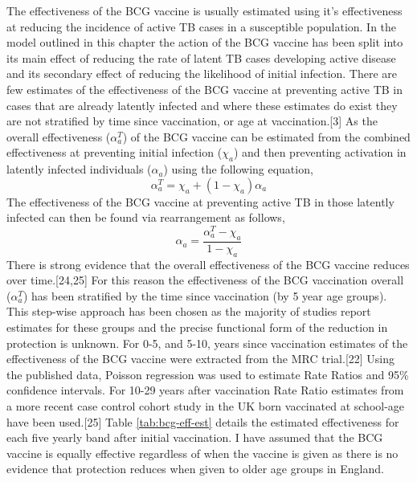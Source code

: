 \documentclass[11pt,twoside]{bristolthesis}
\begin{document}
  The effectiveness of the BCG vaccine is usually estimated using it's effectiveness at reducing the incidence of active TB cases in a susceptible population. In the model outlined in this chapter the action of the BCG vaccine has been split into its main effect of reducing the rate of latent TB cases developing active disease and its secondary effect of reducing the likelihood of initial infection. There are few estimates of the effectiveness of the BCG vaccine at preventing active TB in cases that are already latently infected and where these estimates do exist they are not stratified by time since vaccination, or age at vaccination.{[}3{]} As the overall effectiveness (\(\alpha^T_a\)) of the BCG vaccine can be estimated from the combined effectiveness at preventing initial infection (\(\chi_a\)) and then preventing activation in latently infected individuals (\(\alpha_a\)) using the following equation,
  \begin{equation}
    \alpha^T_a = \chi_a + (1 - \chi_a) \alpha_a
    \label{eq:full-bcg-effectiveness}
  \end{equation}
  The effectiveness of the BCG vaccine at preventing active TB in those latently infected can then be found via rearrangement as follows,
  \begin{equation}
    \alpha_a = \frac{\alpha^T_a - \chi_a}{1 - \chi_a}
    \label{eq:latent-active-bcg-effectiveness}
  \end{equation}
  There is strong evidence that the overall effectiveness of the BCG vaccine reduces over time.{[}24,25{]} For this reason the effectiveness of the BCG vaccination overall (\(\alpha^T_a\)) has been stratified by the time since vaccination (by 5 year age groups). This step-wise approach has been chosen as the majority of studies report estimates for these groups and the precise functional form of the reduction in protection is unknown. For 0-5, and 5-10, years since vaccination estimates of the effectiveness of the BCG vaccine were extracted from the MRC trial.{[}22{]} Using the published data, Poisson regression was used to estimate Rate Ratios and 95\% confidence intervals. For 10-29 years after vaccination Rate Ratio estimates from a more recent case control cohort study in the UK born vaccinated at school-age have been used.{[}25{]} Table \ref{tab:bcg-eff-est} details the estimated effectiveness for each five yearly band after initial vaccination. I have assumed that the BCG vaccine is equally effective regardless of when the vaccine is given as there is no evidence that protection reduces when given to older age groups in England.
\end{document}
